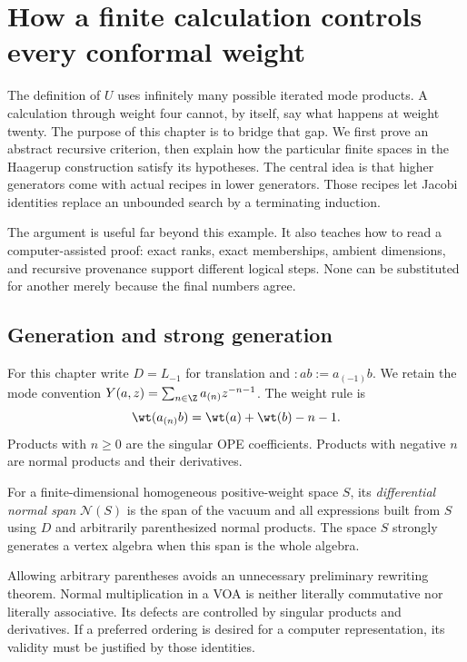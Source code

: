 \chapter{How a finite calculation controls every conformal weight}
\label{ch:finite_closure}

The definition of $U$ uses infinitely many possible iterated mode
products. A calculation through weight four cannot, by itself, say
what happens at weight twenty. The purpose of this chapter is to bridge
that gap. We first prove an abstract recursive criterion, then explain
how the particular finite spaces in the Haagerup construction satisfy
its hypotheses. The central idea is that higher generators come with
actual recipes in lower generators. Those recipes let Jacobi identities
replace an unbounded search by a terminating induction.

The argument is useful far beyond this example. It also teaches how
to read a computer-assisted proof: exact ranks, exact memberships,
ambient dimensions, and recursive provenance support different logical
steps. None can be substituted for another merely because the final
numbers agree.

\section{Generation and strong generation}

For this chapter write $D=L_{-1}$ for translation and
$:ab:=a_{(-1)}b$. We retain the mode convention
$Y(a,z)=\sum_{n\in\Z}a_{(n)}z^{-n-1}$. The weight rule is
\begin{equation}\label{eq:c-mode-weight}
 \wt(a_{(n)}b)=\wt(a)+\wt(b)-n-1.
\end{equation}
Products with $n\geq0$ are the singular OPE coefficients. Products
with negative $n$ are normal products and their derivatives.

\begin{definition}
For a finite-dimensional homogeneous positive-weight space $S$, its
\emph{differential normal span} $\mathcal N(S)$ is the span of the
vacuum and all expressions built from $S$ using $D$ and arbitrarily
parenthesized normal products. The space $S$ strongly generates a
vertex algebra when this span is the whole algebra.
\end{definition}

Allowing arbitrary parentheses avoids an unnecessary preliminary
rewriting theorem. Normal multiplication in a VOA is neither literally
commutative nor literally associative. Its defects are controlled by
singular products and derivatives. If a preferred ordering is desired
for a computer representation, its validity must be justified by those
identities.

